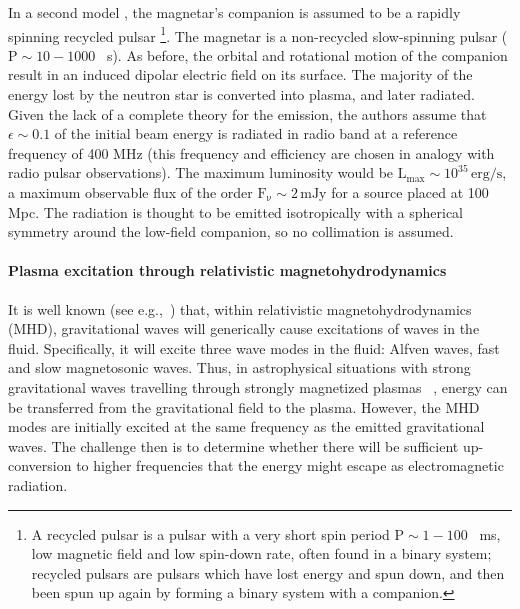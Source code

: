 In a second model \cite{Hansen:2000am}, the magnetar's companion is
assumed to be a rapidly spinning recycled pulsar \footnote{A recycled pulsar is a pulsar with a very short spin period $\mathrm{P}
\sim 1-100$ ~ms, low magnetic field and low spin-down rate, often found in a binary system; recycled pulsars are pulsars which have lost energy and spun down, and then been spun up again by forming a binary system with a companion.}. The magnetar is a
non-recycled slow-spinning pulsar ($\mathrm{P} \sim 10-1000$ ~s). As before,
the orbital and rotational motion of the companion result in an
induced dipolar electric field on its surface.  The majority of the
energy lost by the neutron star is converted into plasma, and later
radiated.  Given the lack of a complete theory for the emission, the
authors assume that $\epsilon \sim 0.1$ of the initial beam energy
is radiated in radio band at a reference frequency of 400 MHz (this
frequency and efficiency are chosen in analogy with radio pulsar
observations).  The maximum luminosity would be $\mathrm{L_{max}}\sim 10^{35}\,\mathrm{erg/s}$, a maximum observable flux of the order
$\mathrm{F_{\nu} \sim 2\,mJy}$ for a source placed at 100 Mpc. The radiation is thought to be emitted isotropically with a spherical symmetry around the low-field companion, so no collimation is assumed.


\paragraph{Plasma excitation through relativistic magnetohydrodynamics}

It is well known (see
e.g.,~\cite{Duez:2005sg,Duez:2005sf,Moortgat:2005fs,Moortgat:2004xz})
that, within relativistic magnetohydrodynamics (MHD), gravitational
waves will generically cause excitations of waves in the fluid.
Specifically, it will excite three wave modes in the fluid: Alfven
waves, fast and slow magnetosonic waves.  Thus, in
astrophysical situations with strong gravitational waves travelling
through strongly magnetized plasmas ~\cite{Moortgat:2004xz}, energy
can be transferred from the gravitational field to the plasma.
However, the MHD modes are initially excited at the same frequency
as the emitted gravitational waves.  The challenge then is to
determine whether there will be sufficient up-conversion to higher
frequencies that the energy might escape as electromagnetic
radiation.

